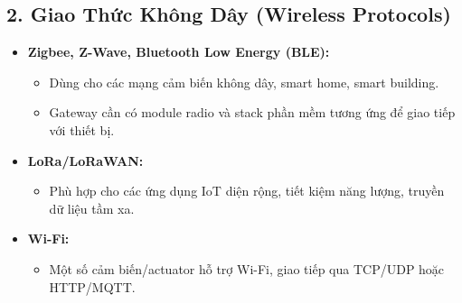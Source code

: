 \begin{itemize}
\begin{itemize}
        \subsection*{2. Giao Thức Không Dây (Wireless Protocols)}
        \begin{itemize}
            \item \textbf{Zigbee, Z-Wave, Bluetooth Low Energy (BLE):}
            \begin{itemize}
                \item Dùng cho các mạng cảm biến không dây, smart home, smart building.
                \item Gateway cần có module radio và stack phần mềm tương ứng để giao tiếp với thiết bị.
            \end{itemize}
            \item \textbf{LoRa/LoRaWAN:}
            \begin{itemize}
                \item Phù hợp cho các ứng dụng IoT diện rộng, tiết kiệm năng lượng, truyền dữ liệu tầm xa.
            \end{itemize}
            \item \textbf{Wi-Fi:}
            \begin{itemize}
                \item Một số cảm biến/actuator hỗ trợ Wi-Fi, giao tiếp qua TCP/UDP hoặc HTTP/MQTT.
            \end{itemize}
        \end{itemize}

\end{itemize}
\end{itemize}
